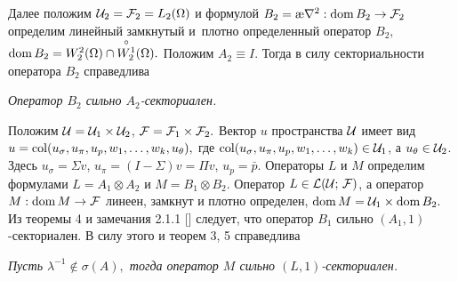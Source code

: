 Далее положим ${\cal U}_2={\cal F}_2=L_2(\Omega)$ и формулой \mbox{$B_2=\text{\ae} {\nabla}^2 : {\rm dom}\, B_2 \to {\cal F}_2$}
определим линейный замкнутый и~плотно определенный оператор $B_2,$ \linebreak $ {\rm dom }\, B_2= W_2^2(\Omega) \cap {\stackrel{\circ}{W_2^1}}(\Omega ).$
Положим $A_2 \equiv I .$
Тогда в силу секториальности оператора $B_2$ %
справедлива


\begin{theorem}[5]{\it Оператор $B_2$ сильно $A_2$-секториален.}
 \end{theorem}
 \smallskip

Положим ${\cal U}={\cal U}_1 \times {\cal U}_2$, ${\cal F}={\cal F}_1 \times {\cal F}_2.$ 
Вектор  $u$  пространства ${\cal U}$  имеет вид $u={\rm col} (u_{\sigma}, u_{\pi}, u_p, w_1, \ldots , w_k, u_{\theta}),$ 
где ${\rm col} (u_{\sigma }, u_{\pi}, u_p, w_1, \ldots , w_k) \in {\cal U}_1$, а  
$u_{\theta } \in {\cal U}_2$.
Здесь $u_{\sigma}= \Sigma v$, $u_{\pi}= (I- \Sigma )v =\Pi v$, $u_p={\bar p}.$ 
Операторы $L$ и $M$ определим формулами  $L=A_1 \otimes A_2$  и  $M=B_1 \otimes B_2$.  
Оператор  $L \in {\cal L (U;\,F)}$,  а оператор $M:  {\rm dom}\, M \to {\cal F}$  линеен,
замкнут и плотно определен, ${\rm dom}\, M={\cal U}_1 \times {\rm dom}\, B_2.$
Из теоремы 4 и замечания 2.1.1 [] следует, что оператор $B_1$ сильно $(A_1,1)$-секториален. 
В силу этого и теорем 3, 5 справедлива 

\begin{theorem}[6]{\it Пусть ${\lambda}^{-1} \not\in \sigma (A),$
тогда оператор $M$ сильно   $(L,1)$-секто\-риален.}
 \end{theorem}

